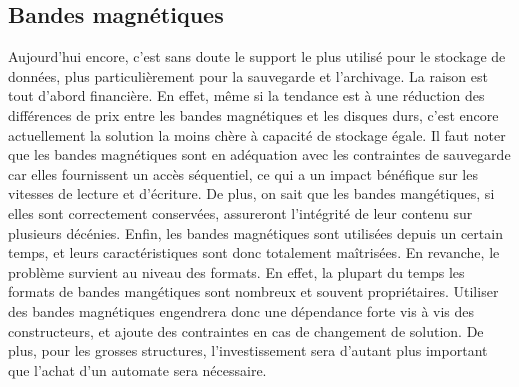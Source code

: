 \documentclass[a4paper,11pt]{report}
\begin{document}
\subsection{Bandes magnétiques}
Aujourd'hui encore, c'est sans doute le support le plus utilisé pour le stockage de données, plus particulièrement pour la sauvegarde et l'archivage.
La raison est tout d'abord financière. En effet, même si la tendance est à une réduction des différences de prix entre les bandes magnétiques et les disques durs, c'est encore actuellement la solution la moins chère à capacité de stockage égale.
Il faut noter que les bandes magnétiques sont en adéquation avec les contraintes de sauvegarde car elles fournissent un accès séquentiel, ce qui a un impact bénéfique sur les vitesses de lecture et d'écriture.
De plus, on sait que les bandes mangétiques, si elles sont correctement conservées, assureront l'intégrité de leur contenu sur plusieurs décénies.
Enfin, les bandes magnétiques sont utilisées depuis un certain temps, et leurs caractéristiques sont donc totalement maîtrisées.
En revanche, le problème survient au niveau des formats. En effet, la plupart du temps les formats de bandes mangétiques sont nombreux et souvent propriétaires. Utiliser des bandes magnétiques engendrera donc une dépendance forte vis à vis des constructeurs, et ajoute des contraintes en cas de changement de solution.
De plus, pour les grosses structures, l'investissement sera d'autant plus important que l'achat d'un automate sera nécessaire.
\end{document}
